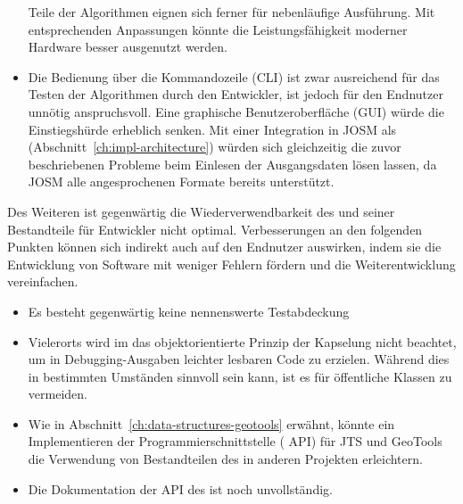 \documentclass[../main/thesis.tex]{subfiles}
\begin{document}
\begin{itemize}
Teile der Algorithmen eignen sich ferner für nebenläufige Ausführung.
Mit entsprechenden Anpassungen könnte die Leistungsfähigkeit moderner Hardware besser ausgenutzt werden.

\item
Die Bedienung über die Kommandozeile (CLI) ist zwar ausreichend für das Testen der Algorithmen durch den Entwickler, ist jedoch für den Endnutzer unnötig anspruchsvoll.
Eine graphische Benutzeroberfläche (GUI) würde die Einstiegshürde erheblich senken.
Mit einer Integration in JOSM als  (Abschnitt~\ref{ch:impl-architecture}) würden sich gleichzeitig die zuvor beschriebenen Probleme beim Einlesen der Ausgangsdaten lösen lassen, da JOSM alle angesprochenen Formate bereits unterstützt.

\end{itemize}

Des Weiteren ist gegenwärtig die Wiederverwendbarkeit des  und seiner Bestandteile für Entwickler nicht optimal.
Verbesserungen an den folgenden Punkten können sich indirekt auch auf den Endnutzer auswirken, indem sie die Entwicklung von Software mit weniger Fehlern fördern und die Weiterentwicklung vereinfachen.
%
\begin{itemize}

\item
Es besteht gegenwärtig keine nennenswerte Testabdeckung 

\item
Vielerorts wird im  das objektorientierte Prinzip der Kapselung nicht beachtet, um in Debugging-Ausgaben leichter lesbaren Code zu erzielen.
Während dies in bestimmten Umständen sinnvoll sein kann, ist es für öffentliche Klassen zu vermeiden. 

\item
Wie in Abschnitt~\ref{ch:data-structures-geotools} erwähnt, könnte ein Implementieren der Programmierschnittstelle ( API) für JTS und GeoTools die Verwendung von Bestandteilen des  in anderen Projekten erleichtern.

\item
Die Dokumentation der API des  ist noch unvollständig.

\end{itemize}
\end{document}
